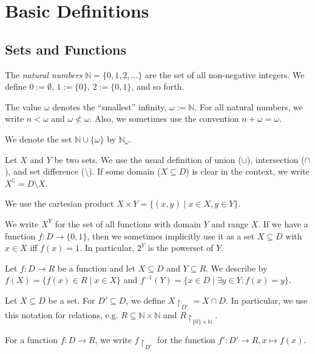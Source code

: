 \section{Basic Definitions}

\subsection{Sets and Functions}
\begin{defn}
	The \emph{natural numbers} $\mathbb{N} = \{0, 1, 2, \dots\}$ are the set of all non-negative integers. We define $0 := \emptyset$, $1 := \{0\}$, $2 := \{0, 1\}$, and so forth.
	
	The value $\omega$ denotes the \enquote{smallest} infinity, $\omega := \mathbb{N}$. For all natural numbers, we write $n < \omega$ and $\omega \not < \omega$. Also, we sometimes use the convention $n + \omega = \omega$.
	
	We denote the set $\mathbb{N} \cup \{\omega\}$ by $\mathbb{N}_\omega$.
\end{defn}

\begin{defn}
	Let $X$ and $Y$ be two sets. We use the usual definition of union ($\cup$), intersection ($\cap$), and set difference ($\setminus$). If some domain ($X \subseteq D$) is clear in the context, we write $X^\complement = D \setminus X$.
	
	We use the cartesian product $X \times Y = \{ (x, y) \mid x \in X, y \in Y \}$.
	
	We write $X^Y$ for the set of all functions with domain $Y$ and range $X$. If we have a function $f : D \rightarrow \{0, 1\}$, then we sometimes implicitly use it as a set $X \subseteq D$ with $x \in X$ iff $f(x) = 1$. In particular, $2^Y$ is the powerset of $Y$.
\end{defn}

\begin{defn}
	Let $f : D \rightarrow R$ be a function and let $X \subseteq D$ and $Y \subseteq R$. We describe by $f(X) = \{ f(x) \in R \mid x \in X\}$ and $f^{-1}(Y) = \{ x \in D \mid \exists y \in Y: f(x) = y \}$.
\end{defn}

\begin{defn}
	Let $X \subseteq D$ be a set. For $D' \subseteq D$, we define $X \upharpoonright_{D'} = X \cap D$. In particular, we use this notation for relations, e.g. $R \subseteq \mathbb{N} \times \mathbb{N}$ and $R \upharpoonright_{\{0\} \times \mathbb{N}}$.
	
	For a function $f : D \rightarrow R$, we write $f \upharpoonright_{D'}$ for the function $f' : D' \rightarrow R, x \mapsto f(x)$.
\end{defn}


